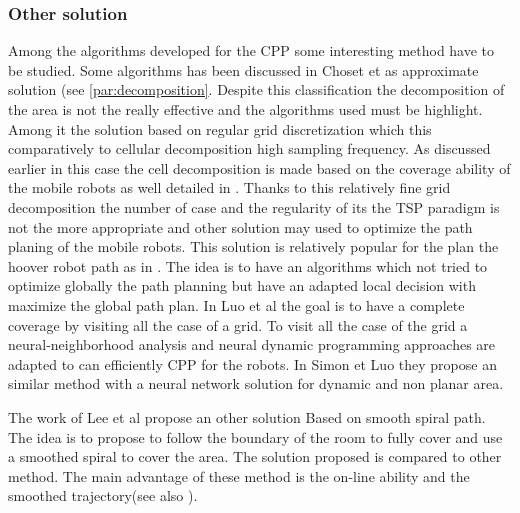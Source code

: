 %		
%		
		
		\subsubsection{Other solution}
		
		Among the algorithms developed for the CPP some interesting method have to be studied.		
		Some algorithms has been discussed in Choset et \cite{214*choset2001} as approximate solution (see \ref{par:decomposition}. Despite this classification the decomposition of the area is not the really effective and the algorithms used must be highlight. Among it the solution based on regular grid discretization which this  comparatively to cellular decomposition high sampling frequency. As discussed earlier in this case the cell decomposition is made based on the coverage ability of the  mobile robots as  well detailed in \citep{218*meiting2007}.
		Thanks to this relatively fine grid decomposition the number of case and the regularity of its the TSP paradigm is not the more appropriate and other solution may used to optimize the path planing of the mobile robots.
		This solution is relatively popular for the plan the hoover robot path as in  \citep{216*luo2002,196*yang2004,215*lee2010,218*meiting2007}.
		The idea is to have an algorithms which not tried to optimize globally the path planning but have an adapted local decision with maximize the global path plan. In Luo et al \citep{216*luo2002} the goal is to have a complete coverage by visiting all the case of a grid. To visit all the case of the grid a neural-neighborhood analysis and neural dynamic programming approaches are adapted to can efficiently CPP for the robots. In Simon et Luo \citep{196*yang2004} they propose an similar method with a neural network solution for dynamic and non planar area.
		
		The work of Lee et al \cite{215*lee2010} propose an other solution Based on smooth spiral path. The idea is to propose to follow the boundary of the room to fully cover and use a smoothed spiral to cover the area. The solution proposed is compared to other method. The main advantage of these method is the on-line ability and the smoothed trajectory(see also \citep{195*choi2009}).
		
